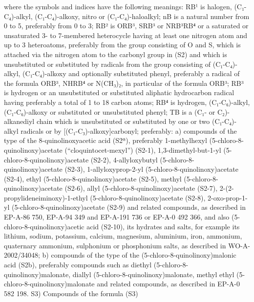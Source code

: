 \documentclass[11pt,a4paper]{article}
\begin{document}
where the symbols and indices have the following meanings: RB¹ is halogen, (C₁-C₄)-alkyl, (C₁-C₄)-alkoxy, nitro or (C₁-C₄)-haloalkyl; nB is a natural number from 0 to 5, preferably from 0 to 3; RB² is ORB³, SRB³ or NRB³RB⁴ or a saturated or unsaturated 3- to 7-membered heterocycle having at least one nitrogen atom and up to 3 heteroatoms, preferably from the group consisting of O and S, which is attached via the nitrogen atom to the carbonyl group in (S2) and which is unsubstituted or substituted by radicals from the group consisting of (C₁-C₄)-alkyl, (C₁-C₄)-alkoxy and optionally substituted phenyl, preferably a radical of the formula ORB³, NHRB⁴ or N(CH₃)₂, in particular of the formula ORB³; RB³ is hydrogen or an unsubstituted or substituted aliphatic hydrocarbon radical having preferably a total of 1 to 18 carbon atoms; RB⁴ is hydrogen, (C₁-C₆)-alkyl, (C₁-C₆)-alkoxy or substituted or unsubstituted phenyl; TB is a (C₁- or C₂)-alkanediyl chain which is unsubstituted or substituted by one or two (C₁-C₄)-alkyl radicals or by [(C₁-C₃)-alkoxy]carbonyl; preferably: a) compounds of the type of the 8-quinolinoxyacetic acid (S2ª), preferably 1-methylhexyl (5-chloro-8-quinolinoxy)acetate (“cloquintocet-mexyl”) (S2-1), 1,3-dimethyl-but-1-yl (5-chloro-8-quinolinoxy)acetate (S2-2), 4-allyloxybutyl (5-chloro-8-quinolinoxy)acetate (S2-3), 1-allyloxyprop-2-yl (5-chloro-8-quinolinoxy)acetate (S2-4), ethyl (5-chloro-8-quinolinoxy)acetate (S2-5), methyl (5-chloro-8-quinolinoxy)acetate (S2-6), allyl (5-chloro-8-quinolinoxy)acetate (S2-7), 2-(2-propylideneiminoxy)-1-ethyl (5-chloro-8-quinolinoxy)acetate (S2-8), 2-oxo-prop-1-yl (5-chloro-8-quinolinoxy)acetate (S2-9) and related compounds, as described in EP-A-86 750, EP-A-94 349 and EP-A-191 736 or EP-A-0 492 366, and also (5-chloro-8-quinolinoxy)acetic acid (S2-10), its hydrates and salts, for example its lithium, sodium, potassium, calcium, magnesium, aluminium, iron, ammonium, quaternary ammonium, sulphonium or phosphonium salts, as described in WO-A-2002/34048; b) compounds of the type of the (5-chloro-8-quinolinoxy)malonic acid (S2b), preferably compounds such as diethyl (5-chloro-8-quinolinoxy)malonate, diallyl (5-chloro-8-quinolinoxy)malonate, methyl ethyl (5-chloro-8-quinolinoxy)malonate and related compounds, as described in EP-A-0 582 198. S3) Compounds of the formula (S3)
\end{document}
